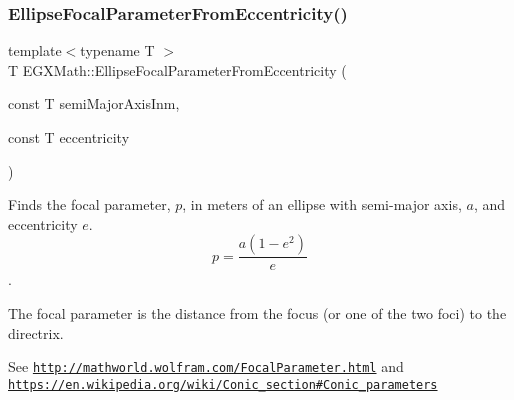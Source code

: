 \subsubsection{\texorpdfstring{Ellipse\+Focal\+Parameter\+From\+Eccentricity()}{EllipseFocalParameterFromEccentricity()}}
{\footnotesize\ttfamily template$<$typename T $>$ \\
T E\+G\+X\+Math\+::\+Ellipse\+Focal\+Parameter\+From\+Eccentricity (\begin{DoxyParamCaption}\item[{const T}]{semi\+Major\+Axis\+Inm,  }\item[{const T}]{eccentricity }\end{DoxyParamCaption})}



Finds the focal parameter, $p$, in meters of an ellipse with semi-\/major axis, $a$, and eccentricity $e$. \[ p=\frac{a(1-e^2)}{e} \]. 

The focal parameter is the distance from the focus (or one of the two foci) to the directrix.

See \href{http://mathworld.wolfram.com/FocalParameter.html}{\tt http\+://mathworld.\+wolfram.\+com/\+Focal\+Parameter.\+html} and \href{https://en.wikipedia.org/wiki/Conic_section#Conic_parameters}{\tt https\+://en.\+wikipedia.\+org/wiki/\+Conic\+\_\+section\#\+Conic\+\_\+parameters}


